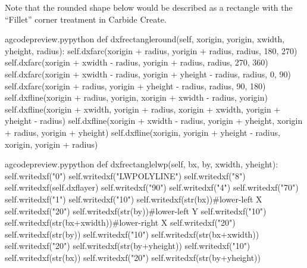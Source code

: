 \documentclass{ltxdoc}
\begin{document}
Note that the rounded shape below would be described as a rectangle with the ``Fillet'' corner treatment in Carbide Create.

\lstset{firstnumber=\thegcpy}
\begin{writecode}{a}{gcodepreview.py}{python}
    def dxfrectangleround(self, xorigin, yorigin, xwidth, yheight, radius):
        self.dxfarc(xorigin + radius, yorigin + radius, radius,  180, 270)
        self.dxfarc(xorigin + xwidth - radius, yorigin + radius, radius, 270, 360)
        self.dxfarc(xorigin + xwidth - radius, yorigin + yheight - radius, radius, 0, 90)
        self.dxfarc(xorigin + radius, yorigin + yheight - radius, radius, 90, 180)
        self.dxfline(xorigin + radius, yorigin, xorigin + xwidth - radius, yorigin)
        self.dxfline(xorigin + xwidth, yorigin + radius, xorigin + xwidth, yorigin + yheight - radius)
        self.dxfline(xorigin + xwidth - radius, yorigin + yheight, xorigin + radius, yorigin + yheight)
        self.dxfline(xorigin, yorigin + yheight - radius, xorigin, yorigin + radius)

\end{writecode}
\addtocounter{gcpy}{10}

\lstset{firstnumber=\thegcpy}
\begin{writecode}{a}{gcodepreview.py}{python}
    def dxfrectanglelwp(self, bx, by, xwidth, yheight):
        self.writedxf("0")
        self.writedxf("LWPOLYLINE")
        self.writedxf("8")
        self.writedxf(self.dxflayer)
        self.writedxf("90")
        self.writedxf("4")
        self.writedxf("70")
        self.writedxf("1")
        self.writedxf("10")
        self.writedxf(str(bx))#lower-left X
        self.writedxf("20")
        self.writedxf(str(by))#lower-left Y
        self.writedxf("10")
        self.writedxf(str(bx+xwidth))#lower-right X
        self.writedxf("20")
        self.writedxf(str(by))
        self.writedxf("10")
        self.writedxf(str(bx+xwidth))
        self.writedxf("20")
        self.writedxf(str(by+yheight))
        self.writedxf("10")
        self.writedxf(str(bx))
        self.writedxf("20")
        self.writedxf(str(by+yheight))

\end{writecode}
\addtocounter{gcpy}{26}

\end{document}
